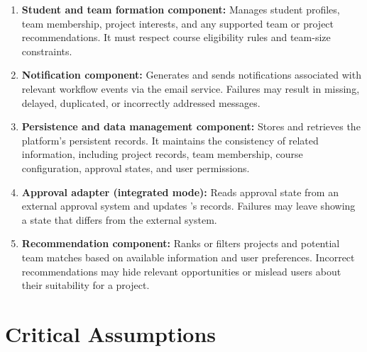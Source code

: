 \documentclass{article}
\begin{document}
\begin{enumerate}
    \item \textbf{Student and team formation component:}
    Manages student profiles, team membership, project interests, and any supported team or project
    recommendations. It must respect course eligibility rules and team-size constraints.

    \item \textbf{Notification component:}
    Generates and sends notifications associated with relevant workflow events via the email service.
    Failures may result in missing, delayed, duplicated, or incorrectly addressed messages.

    \item \textbf{Persistence and data management component:}
    Stores and retrieves the platform's persistent records.
    It maintains the consistency of related information,
    including project records, team membership, course
    configuration, approval states, and user permissions.

    \item \textbf{Approval adapter (integrated mode):}
    Reads approval state from an external approval system and updates \projname{}'s records.
    Failures may leave \projname{} showing a state that differs from the external system.

    \item \textbf{Recommendation component:}
    Ranks or filters projects and potential
    team matches based on available information and user
    preferences. Incorrect recommendations may hide
    relevant opportunities or mislead users about their
    suitability for a project.
\end{enumerate}

\section{Critical Assumptions}

\end{document}
